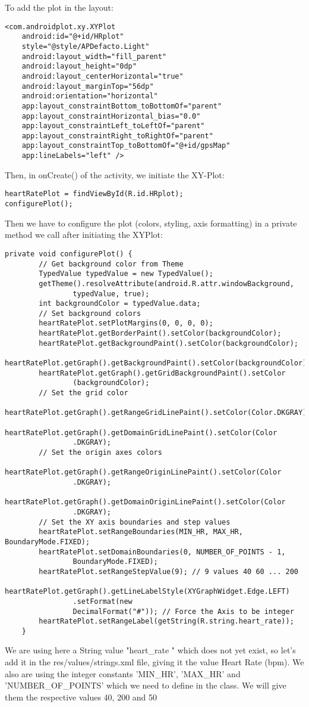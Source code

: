 \documentclass[11pt]{article}
\begin{document}
To add the plot in the layout:
\begin{lstlisting}
<com.androidplot.xy.XYPlot
    android:id="@+id/HRplot"
    style="@style/APDefacto.Light"
    android:layout_width="fill_parent"
    android:layout_height="0dp"
    android:layout_centerHorizontal="true"
    android:layout_marginTop="56dp"
    android:orientation="horizontal"
    app:layout_constraintBottom_toBottomOf="parent"
    app:layout_constraintHorizontal_bias="0.0"
    app:layout_constraintLeft_toLeftOf="parent"
    app:layout_constraintRight_toRightOf="parent"
    app:layout_constraintTop_toBottomOf="@+id/gpsMap"
    app:lineLabels="left" />
\end{lstlisting}
Then, in onCreate() of the activity, we initiate the XY-Plot:
\begin{lstlisting}
heartRatePlot = findViewById(R.id.HRplot);
configurePlot();
\end{lstlisting}
Then we have to configure the plot (colors, styling, axis formatting) in a private method we call after initiating the XYPlot:
\begin{lstlisting}
private void configurePlot() {
        // Get background color from Theme
        TypedValue typedValue = new TypedValue();
        getTheme().resolveAttribute(android.R.attr.windowBackground,
                typedValue, true);
        int backgroundColor = typedValue.data;
        // Set background colors
        heartRatePlot.setPlotMargins(0, 0, 0, 0);
        heartRatePlot.getBorderPaint().setColor(backgroundColor);
        heartRatePlot.getBackgroundPaint().setColor(backgroundColor);
        heartRatePlot.getGraph().getBackgroundPaint().setColor(backgroundColor);
        heartRatePlot.getGraph().getGridBackgroundPaint().setColor
                (backgroundColor);
        // Set the grid color
        heartRatePlot.getGraph().getRangeGridLinePaint().setColor(Color.DKGRAY);
        heartRatePlot.getGraph().getDomainGridLinePaint().setColor(Color
                .DKGRAY);
        // Set the origin axes colors
        heartRatePlot.getGraph().getRangeOriginLinePaint().setColor(Color
                .DKGRAY);
        heartRatePlot.getGraph().getDomainOriginLinePaint().setColor(Color
                .DKGRAY);
        // Set the XY axis boundaries and step values
        heartRatePlot.setRangeBoundaries(MIN_HR, MAX_HR, BoundaryMode.FIXED);
        heartRatePlot.setDomainBoundaries(0, NUMBER_OF_POINTS - 1,
                BoundaryMode.FIXED);
        heartRatePlot.setRangeStepValue(9); // 9 values 40 60 ... 200
        heartRatePlot.getGraph().getLineLabelStyle(XYGraphWidget.Edge.LEFT)
                .setFormat(new
                DecimalFormat("#")); // Force the Axis to be integer
        heartRatePlot.setRangeLabel(getString(R.string.heart_rate));
	}
\end{lstlisting}
We are using here a String value "heart\_rate " which does not yet exist, so let’s add it in the res/values/strings.xml file, giving it the value Heart Rate (bpm). We also are using the integer constants 'MIN\_HR', 'MAX\_HR' and 'NUMBER\_OF\_POINTS' which we need to define in the class. We will give them the respective values 40, 200 and 50
\end{document}
